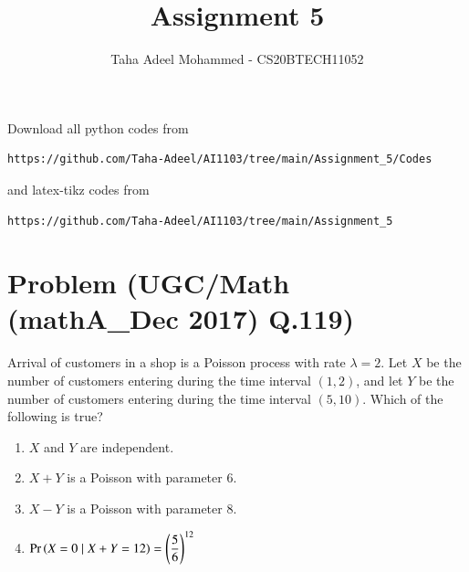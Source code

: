 \documentclass[journal,12pt,twocolumn]{IEEEtran}
\begin{document}
     \def\rightbox#1{\makebox[0in][r]{#1}}
     \def\centbox#1{\makebox[0in]{#1}}
     \def\topbox#1{\raisebox{-\baselineskip}[0in][0in]{#1}}
     \def\midbox#1{\raisebox{-0.5\baselineskip}[0in][0in]{#1}}
\vspace{3cm}
\title{Assignment 5}
\author{Taha Adeel Mohammed - CS20BTECH11052}
\maketitle
\newpage
\bigskip
\renewcommand{\thefigure}{\theenumi}
\renewcommand{\thetable}{\theenumi}
Download all python codes from 
\begin{lstlisting}
https://github.com/Taha-Adeel/AI1103/tree/main/Assignment_5/Codes
\end{lstlisting}
%
and latex-tikz codes from 
%
\begin{lstlisting}
https://github.com/Taha-Adeel/AI1103/tree/main/Assignment_5
\end{lstlisting}
\section{Problem (UGC/Math (mathA\_Dec 2017) Q.119)}
Arrival of customers in a shop is a Poisson process with rate $\lambda =2$. Let $X$ be the number of customers entering during the time interval $(1,2)$, and let $Y$ be the number of customers entering during the time interval $(5,10)$. Which of the following is true?
\begin{enumerate}[label=(\Alph*)]
    \item$X$ and $Y$ are independent.\\
    \item$X+Y$ is a Poisson with parameter $6$. \\
    \item$X-Y$ is a Poisson with parameter $8$.\\
    \item$\Pr\left(X=0\mid X+Y=12\right)=\left(\dfrac{5}{6}\right)^{12}$
\end{enumerate}
\end{document}
